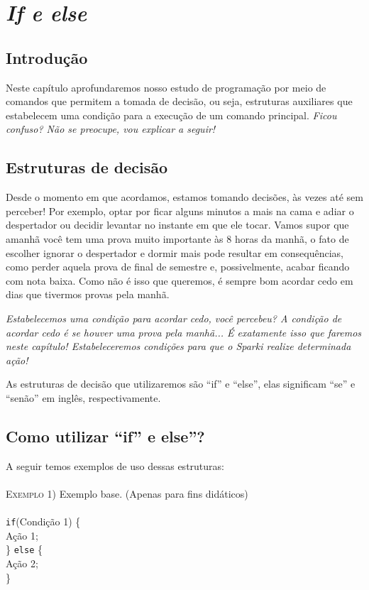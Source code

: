 \chapter{\textit{If e else}}
\section*{Introdução}
    Neste capítulo aprofundaremos nosso estudo de programação por meio de comandos que permitem a tomada de decisão, ou seja,  estruturas auxiliares que estabelecem uma condição para a execução de um comando principal. \textsl{Ficou confuso? Não se preocupe, vou explicar a seguir!}

\section{Estruturas de decisão}
    Desde o momento em que acordamos, estamos tomando decisões, às vezes até sem perceber! Por exemplo, optar por ficar alguns minutos a mais na cama e adiar o despertador ou decidir levantar no instante em que ele tocar. Vamos supor que amanhã você tem uma prova muito importante às 8 horas da manhã, o fato de escolher ignorar o despertador e dormir mais pode resultar em consequências, como perder aquela prova de final de semestre e, possivelmente, acabar ficando com nota baixa. Como não é isso que queremos, é sempre bom acordar cedo em dias que tivermos provas pela manhã.
    
    \begin{center}
        \textsl{Estabelecemos uma condição para acordar cedo, você percebeu? A condição de acordar cedo é se houver uma prova pela manhã... É exatamente isso que faremos neste capítulo! Estabeleceremos condições para que o \textsl{Sparki} realize determinada ação!}
    \end{center}
   
    \indent As estruturas de decisão que utilizaremos são ``if'' e ``else'', elas significam ``se'' e ``senão'' em inglês, respectivamente.
    
\section{Como utilizar ``if'' e else''?}
    A seguir temos exemplos de uso dessas estruturas:
    \\
    \\
    \textsc{Exemplo 1)} Exemplo base. (Apenas para fins didáticos)
    \\
    \\
    \noindent \texttt{if}(Condição 1) \{\\
    \indent Ação 1;\\
    \} \texttt{else} \{\\
    \indent Ação 2;\\
    \}\\
    
